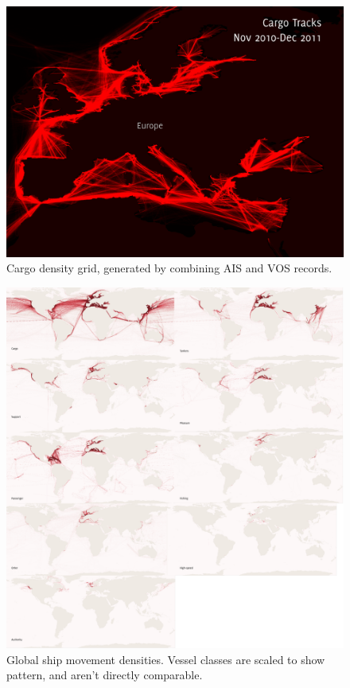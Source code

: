 \begin{figure}[h!]
  \centering
    \includegraphics[width=140mm]{figures/cargo-lanes-eu-red-labeled.pdf}
  \caption[Cargo density, Europe]{Cargo density grid, generated by combining AIS and VOS records.}
  \label{fig:eu-cargo-density}
\end{figure}

\begin{figure}[ht]
  \centering
    \includegraphics[width=160mm]{figures/9fold-map-labeled-2x5.pdf}
  \caption[Ship movement densities]{Global ship movement densities. Vessel classes are scaled to show pattern, and aren't directly comparable.}
  \label{fig:9fold-ship-maps}
\end{figure}



